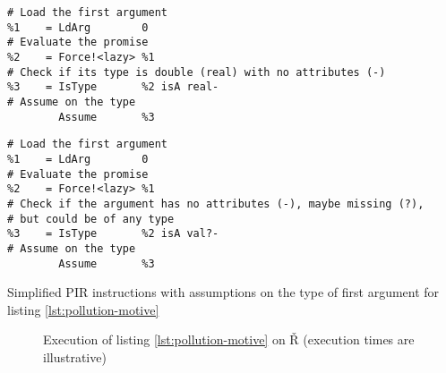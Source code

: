 \begin{listing}
	\begin{sublisting}{\textwidth}
		\begin{verbatim}
# Load the first argument
%1    = LdArg        0
# Evaluate the promise
%2    = Force!<lazy> %1
# Check if its type is double (real) with no attributes (-)
%3    = IsType       %2 isA real-
# Assume on the type
        Assume       %3
    \end{verbatim}
		\label{lst:pollution-pir-real}
	\end{sublisting}

	\vspace{1em}

	\begin{sublisting}{\textwidth}
		\begin{verbatim}
# Load the first argument
%1    = LdArg        0
# Evaluate the promise
%2    = Force!<lazy> %1
# Check if the argument has no attributes (-), maybe missing (?),
# but could be of any type
%3    = IsType       %2 isA val?-
# Assume on the type
        Assume       %3
    \end{verbatim}
		\label{lst:pollution-pir-val}
	\end{sublisting}
	\caption{Simplified PIR instructions with assumptions on the type of first argument for listing \ref{lst:pollution-motive}}
\end{listing}

\begin{figure}
	\centering
  \begin{subfigure}{\linewidth}
		\begin{adjustwidth}{-3cm}{-3cm}
		\end{adjustwidth}
		\label{fig:pollution-motive-baseline}
	\end{subfigure}

	\vspace{2em}

  \begin{subfigure}{\linewidth}
		\begin{adjustwidth}{-3cm}{-3cm}
		\end{adjustwidth}
		\label{fig:pollution-motive-context}
	\end{subfigure}

	\caption{Execution of listing \ref{lst:pollution-motive} on Ř (execution times are illustrative)}
\end{figure}


